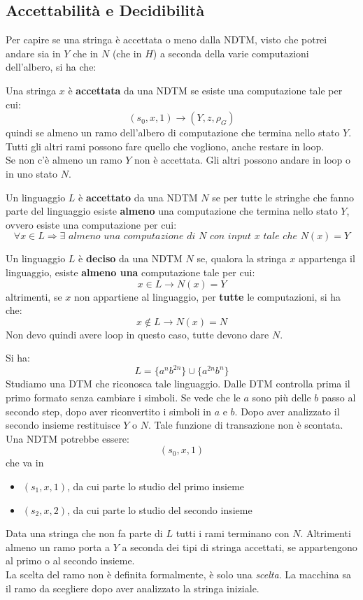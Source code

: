 \subsection{Accettabilità e Decidibilità}
Per capire se una stringa è accettata o meno dalla NDTM, visto che potrei andare
sia in $Y$ che in $N$ (che in $H$) a seconda della varie computazioni
dell'albero, si ha che:
\begin{definizione}
  Una stringa $x$ è \textbf{accettata} da una NDTM se esiste una computazione
  tale per cui:
  \[(s_0,x,1)\to(Y, z, \rho_G)\]
  quindi se almeno un ramo dell'albero di computazione che termina nello stato
  $Y$. Tutti gli altri rami possono fare quello che vogliono, anche restare in
  loop.\\
  Se non c'è almeno un ramo $Y$ non è accettata. Gli altri possono andare in
  loop o in uno stato $N$.
\end{definizione}
\begin{definizione}
  Un linguaggio $L$ è \textbf{accettato} da una NDTM $N$ se per tutte le
  stringhe che fanno parte del linguaggio esiste \textbf{almeno} una computazione che
  termina nello stato $Y$, ovvero esiste una computazione per cui:
  \[\forall x\in L\Rightarrow \exists\,\,almeno\,\, una\,\, computazione\,\, di\,\, N\,\, con\,\, \textit{input}\,\, x\,\, tale\,\, che\,\, N(x)=Y\]
\end{definizione}
\begin{definizione}
  Un linguaggio $L$ è \textbf{deciso} da una NDTM $N$ se, qualora la stringa $x$
  appartenga il linguaggio, esiste \textbf{almeno una} computazione tale per
  cui: 
  \[x\in L\rightarrow N(x)=Y\]
  altrimenti, se $x$ non appartiene al linguaggio, per \textbf{tutte} le
  computazioni, si ha che: 
  \[x\not\in L \rightarrow N(x)=N\]
  Non devo quindi avere loop in questo caso, tutte devono dare $N$.
\end{definizione}
\begin{esempio}
  Si ha:
  \[L=\{a^nb^{2n}\}\cup\{a^{2n}b^n\}\]
  Studiamo una DTM che riconosca tale linguaggio. Dalle DTM controlla prima il
  primo formato senza cambiare i simboli. Se vede che le $a$ sono più delle $b$
  passo al secondo step, dopo aver riconvertito i simboli in $a$ e $b$. Dopo
  aver analizzato il secondo insieme restituisce $Y$ o $N$. Tale funzione di
  transazione non è scontata.\\
  Una NDTM potrebbe essere:
  \[(s_0,x,1)\]
  che va in
  \begin{itemize}
    \item $(s_1,x,1)$, da cui parte lo studio del primo insieme
    \item $(s_2,x,2)$, da cui parte lo studio del secondo insieme
  \end{itemize}
  Data una stringa che non fa parte di $L$ tutti i rami terminano con
  $N$. Altrimenti almeno un ramo porta a $Y$ a seconda dei tipi di stringa
  accettati, se appartengono al primo o al secondo insieme. \\
  La scelta del ramo non è definita formalmente, è solo una \textit{scelta}. La
  macchina sa il ramo da scegliere dopo aver analizzato la stringa iniziale.
\end{esempio}
